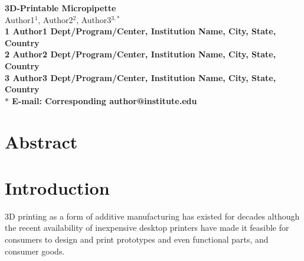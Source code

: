 \pagestyle{myheadings}







\begin{flushleft}
{\Large
\textbf{3D-Printable Micropipette}
}
\\
Author1$^{1}$, 
Author2$^{2}$, 
Author3$^{3,\ast}$
\\
\bf{1} Author1 Dept/Program/Center, Institution Name, City, State, Country
\\
\bf{2} Author2 Dept/Program/Center, Institution Name, City, State, Country
\\
\bf{3} Author3 Dept/Program/Center, Institution Name, City, State, Country
\\
$\ast$ E-mail: Corresponding author@institute.edu
\end{flushleft}

\section*{Abstract}


\section*{Introduction}

3D printing as a form of additive manufacturing has existed for decades although the recent availability of inexpensive desktop printers have made it feasible for consumers to design and print prototypes and even functional parts, and consumer goods.

